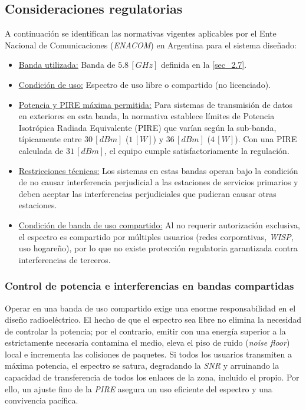 \subsection{Consideraciones regulatorias}
\label{sec_2.17}
A continuación se identifican las normativas vigentes aplicables por el Ente Nacional de Comunicaciones (\textit{ENACOM}) en Argentina \cite{b5} para el sistema diseñado:
\begin{itemize}
    \item \underline{Banda utilizada:} Banda de $5.8 \, [GHz]$ definida en la \autoref{sec_2.7}.
    \item \underline{Condición de uso:} Espectro de uso libre o compartido (no licenciado).
    \item \underline{Potencia y PIRE máxima permitida:} Para sistemas de transmisión de datos en exteriores en esta banda, la normativa establece límites de Potencia Isotrópica Radiada Equivalente (PIRE) que varían según la sub-banda, típicamente entre $30 \, [dBm]$ ($1 \, [W]$) y $36 \, [dBm]$ ($4 \, [W]$). Con una PIRE calculada de $31 \, [dBm]$, el equipo cumple satisfactoriamente la regulación.
    \item \underline{Restricciones técnicas:} Los sistemas en estas bandas operan bajo la condición de no causar interferencia perjudicial a las estaciones de servicios primarios y deben aceptar las interferencias perjudiciales que pudieran causar otras estaciones.
    \item \underline{Condición de banda de uso compartido:} Al no requerir autorización exclusiva, el espectro es compartido por múltiples usuarios (redes corporativas, \textit{WISP}, uso hogareño), por lo que no existe protección regulatoria garantizada contra interferencias de terceros.
\end{itemize}

\subsubsection{Control de potencia e interferencias en bandas compartidas}
\label{sec_2.17.1}
Operar en una banda de uso compartido exige una enorme responsabilidad en el diseño radioeléctrico. El hecho de que el espectro sea libre no elimina la necesidad de controlar la potencia; por el contrario, emitir con una energía superior a la estrictamente necesaria contamina el medio, eleva el piso de ruido (\textit{noise floor}) local e incrementa las colisiones de paquetes. Si todos los usuarios transmiten a máxima potencia, el espectro se satura, degradando la \textit{SNR} y arruinando la capacidad de transferencia de todos los enlaces de la zona, incluido el propio. Por ello, un ajuste fino de la \textit{PIRE} asegura un uso eficiente del espectro y una convivencia pacífica.



